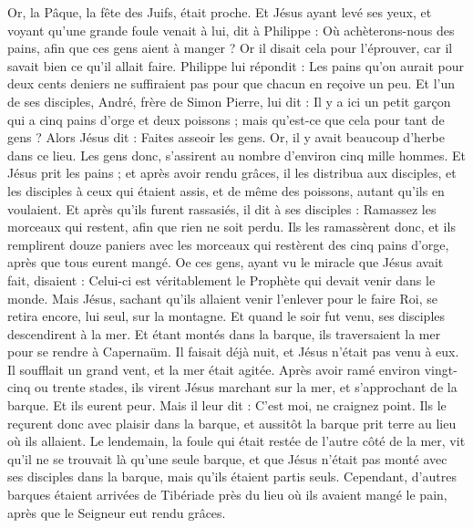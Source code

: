 \begin{multicols}{2}
Or, la Pâque, la fête des Juifs, était proche.
Et Jésus ayant levé ses yeux, et voyant qu'une grande foule venait à lui, dit à Philippe : Où achèterons-nous des pains, afin que ces gens aient à manger ?
Or il disait cela pour l'éprouver, car il savait bien ce qu'il allait faire.
Philippe lui répondit : Les pains qu'on aurait pour deux cents deniers ne suffiraient pas pour que chacun en reçoive un peu.
Et l'un de ses disciples, André, frère de Simon Pierre, lui dit :
Il y a ici un petit garçon qui a cinq pains d'orge et deux poissons ; mais qu'est-ce que cela pour tant de gens ?
Alors Jésus dit : Faites asseoir les gens. Or, il y avait beaucoup d'herbe dans ce lieu. Les gens donc, s'assirent au nombre d'environ cinq mille hommes.
Et Jésus prit les pains ; et après avoir rendu grâces, il les distribua aux disciples, et les disciples à ceux qui étaient assis, et de même des poissons, autant qu'ils en voulaient.
Et après qu'ils furent rassasiés, il dit à ses disciples : Ramassez les morceaux qui restent, afin que rien ne soit perdu.
Ils les ramassèrent donc, et ils remplirent douze paniers avec les morceaux qui restèrent des cinq pains d'orge, après que tous eurent mangé.
Oe ces gens, ayant vu le miracle que Jésus avait fait, disaient : Celui-ci est véritablement le Prophète qui devait venir dans le monde.
Mais Jésus, sachant qu'ils allaient venir l'enlever pour le faire Roi, se retira encore, lui seul, sur la montagne.
Et quand le soir fut venu, ses disciples descendirent à la mer.
Et étant montés dans la barque, ils traversaient la mer pour se rendre à Capernaüm. Il faisait déjà nuit, et Jésus n'était pas venu à eux.
Il soufflait un grand vent, et la mer était agitée.
Après avoir ramé environ vingt-cinq ou trente stades, ils virent Jésus marchant sur la mer, et s'approchant de la barque. Et ils eurent peur.
Mais il leur dit : C'est moi, ne craignez point.
Ils le reçurent donc avec plaisir dans la barque, et aussitôt la barque prit terre au lieu où ils allaient.
Le lendemain, la foule qui était restée de l'autre côté de la mer, vit qu'il ne se trouvait là qu'une seule barque, et que Jésus n'était pas monté avec ses disciples dans la barque, mais qu'ils étaient partis seuls.
Cependant, d'autres barques étaient arrivées de Tibériade près du lieu où ils avaient mangé le pain, après que le Seigneur eut rendu grâces.

\end{multicols}
